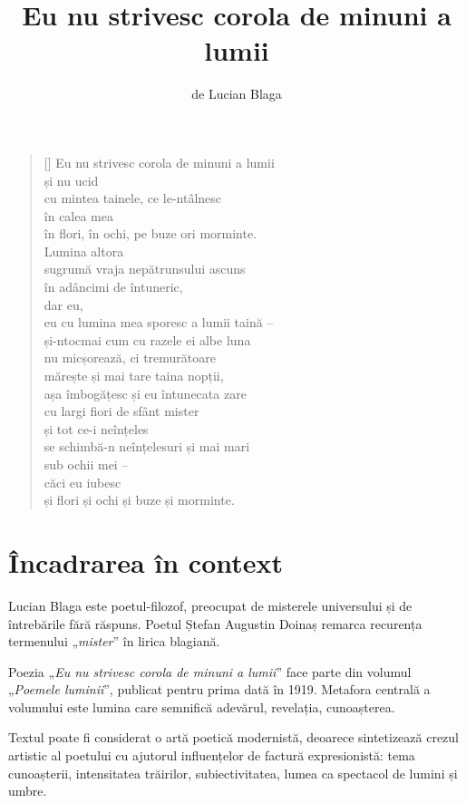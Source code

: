 \documentclass{article}
\title{Eu nu strivesc corola de minuni a lumii}
\author{de Lucian Blaga}
\date{}
\newcommand{\qu}[1]{„\emph{#1}”}
\begin{document}
\maketitle

\settowidth{\versewidth}{eu cu lumina mea sporesc a lumii taină --}
\begin{verse}[\versewidth]
Eu nu strivesc corola de minuni a lumii \\
și nu ucid \\
cu mintea tainele, ce le-ntâlnesc \\
în calea mea \\
în flori, în ochi, pe buze ori morminte. \\
Lumina altora \\
sugrumă vraja nepătrunsului ascuns \\
în adâncimi de întuneric, \\
dar eu, \\
eu cu lumina mea sporesc a lumii taină -- \\
și-ntocmai cum cu razele ei albe luna \\
nu micșorează, ci tremurătoare \\
mărește și mai tare taina nopții, \\
așa îmbogățesc și eu întunecata zare \\
cu largi fiori de sfânt mister \\
și tot ce-i neînțeles \\
se schimbă-n neînțelesuri și mai mari \\
sub ochii mei -- \\
căci eu iubesc \\
și flori și ochi și buze și morminte. \\
\end{verse}

\section{Încadrarea în context}
Lucian Blaga este poetul-filozof, preocupat de misterele universului și de întrebările fără răspuns. Poetul Ștefan Augustin Doinaș remarca recurența termenului \qu{mister} în lirica blagiană.

Poezia \qu{Eu nu strivesc corola de minuni a lumii} face parte din volumul \qu{Poemele luminii}, publicat pentru prima dată în 1919. Metafora centrală a volumului este lumina care semnifică adevărul, revelația, cunoașterea.

Textul poate fi considerat o artă poetică modernistă, deoarece sintetizează crezul artistic al poetului cu ajutorul influențelor de factură expresionistă: tema cunoașterii, intensitatea trăirilor, subiectivitatea, lumea ca spectacol de lumini și umbre.
\end{document}
